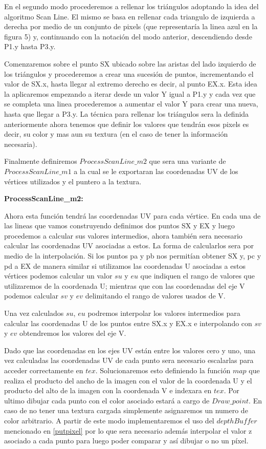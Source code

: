 \documentclass[a4paper]{article}
\newcounter{col}
\begin{document}
\par En el segundo modo procederemos a rellenar los triángulos adoptando la idea del algoritmo Scan Line. El mismo se basa en rellenar cada triangulo de izquierda a derecha por medio de un conjunto de pixels (que representaría la linea azul en la figura 5) y, continuando con la notación del modo anterior, descendiendo desde P1.y hasta P3.y.  
\par Comenzaremos sobre el punto SX ubicado sobre las aristas del lado izquierdo de los triángulos y procederemos a crear una sucesión de puntos, incrementando el valor de SX.x, hasta llegar al extremo derecho es decir, al punto EX.x. Esta idea la aplicaremos empezando a iterar desde un valor Y igual a P1.y y cada vez que se completa una linea procederemos a aumentar el valor Y para crear una nueva, hasta que llegar a P3.y. 
La técnica para rellenar los triángulos sera la definida anteriormente ahora tenemos que definir los valores que tendrán esos pixels es decir, su color y mas aun su textura (en el caso de tener la información necesaria).
\par Finalmente definiremos $ProcessScanLine\_m2$ que sera una variante de $ProcessScanLine\_m1$ a la cual se le exportaran las coordenadas UV de los vértices utilizados y el puntero a la textura.
 
\textbf{ProcessScanLine\_m2:} 


Ahora esta función tendrá las coordenadas UV para cada vértice. En cada una de las lineas que vamos construyendo definimos dos puntos SX y EX y luego procedemos a calcular sus valores intermedios, ahora también sera necesario calcular las coordenadas UV asociadas a estos. La forma de calcularlos sera por medio de la interpolación. Si los puntos pa y pb nos permitían obtener SX y, pc y pd a EX de manera similar si utilizamos las coordenadas U asociadas a estos vértices podemos calcular un valor $su$ y $eu$ que indiquen el rango de valores que utilizaremos de la coordenada U; mientras que con las coordenadas del eje V podemos calcular $sv$ y $ev$ delimitando el rango de valores usados de V.
\par Una vez calculados $su$, $eu$ podremos interpolar los valores intermedios para calcular las coordenadas U de los puntos entre SX.x y EX.x e interpolando con $sv$ y $ev$ obtendremos los valores del eje V.
\par Dado que las coordenadas en los ejes UV están entre los valores cero y uno, una vez calculadas las coordenadas UV de cada punto sera necesario escalarlas para acceder correctamente en $tex$. Solucionaremos esto definiendo la función $map$ que realiza el producto del ancho de la imagen con el valor de la coordenada U y el producto del alto de la imagen con la coordenada V e indexara en $tex$.
Por ultimo dibujar cada punto con el color asociado estará a cargo de $Draw\_point$. En caso de no tener una textura cargada simplemente asignaremos un numero de color arbitrario.  
A partir de este modo implementaremos el uso del $depthBuffer$ mencionado en \ref{putpixel} por lo que sera necesario además interpolar el valor z asociado a cada punto para luego poder comparar y así dibujar o no un píxel.
 
\end{document}
